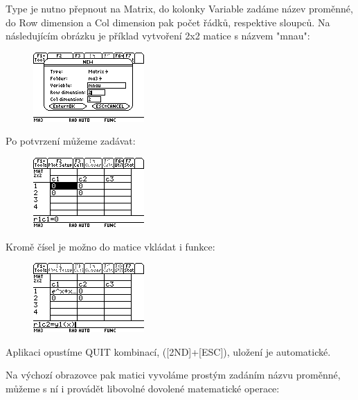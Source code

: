 \documentclass[10pt,a4paper,float]{article}
\begin{document}
Type je nutno přepnout na Matrix, do kolonky Variable zadáme název proměnné, do Row dimension a Col dimension pak počet řádků, respektive sloupců.
Na následujícím obrázku je příklad vytvoření 2x2 matice s názvem "mnau":

\begin{figure}[H]
	\centering
	\includegraphics[width=.5\textwidth]{img/MNAUMATRIX}
\end{figure}

Po potvrzení můžeme zadávat:

\begin{figure}[H]
	\centering
	\includegraphics[width=.5\textwidth]{img/MATRIXEDIT1}
\end{figure}

\pagebreak

Kromě čísel je možno do matice vkládat i funkce:
\begin{figure}[H]
	\centering
	\includegraphics[width=.5\textwidth]{img/MATRIXEDIT2}
\end{figure}

Aplikaci opustíme QUIT kombinací, ([2ND]+[ESC]), uložení je automatické.

Na výchozí obrazovce pak matici vyvoláme prostým zadáním názvu proměnné, můžeme s ní i provádět libovolné dovolené matematické operace:
\end{document}
